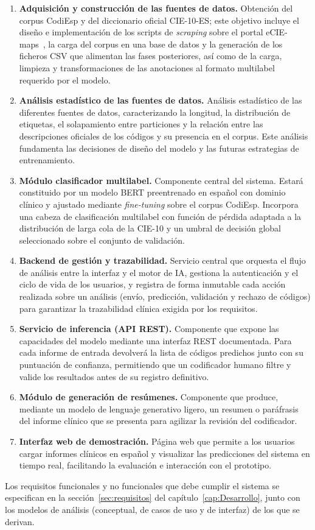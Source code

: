 \begin{enumerate}

 \item \textbf{Adquisición y construcción de las fuentes de datos.} Obtención del corpus CodiEsp y del diccionario oficial CIE-10-ES; este objetivo incluye el diseño e implementación de los scripts de \emph{scraping} sobre el portal eCIE-maps~\cite{eciemaps2024}, la carga del corpus en una base de datos y la generación de los ficheros CSV que alimentan las fases posteriores, así como de la carga, limpieza y transformaciones de las anotaciones al formato multilabel requerido por el modelo.

 \item \textbf{Análisis estadístico de las fuentes de datos.} Análisis estadístico de las diferentes fuentes de datos, caracterizando la longitud, la distribución de etiquetas, el solapamiento entre particiones y la relación entre las descripciones oficiales de los códigos y su presencia en el corpus. Este análisis fundamenta las decisiones de diseño del modelo y las futuras estrategias de entrenamiento.

 \item \textbf{Módulo clasificador multilabel.} Componente central del sistema. Estará constituido por un modelo BERT preentrenado en español con dominio clínico y ajustado mediante \emph{fine-tuning} sobre el corpus CodiEsp. Incorpora una cabeza de clasificación multilabel con función de pérdida adaptada a la distribución de larga cola de la CIE-10 y un umbral de decisión global seleccionado sobre el conjunto de validación.

 \item \textbf{Backend de gestión y trazabilidad.} Servicio central que orquesta el flujo de análisis entre la interfaz y el motor de IA, gestiona la autenticación y el ciclo de vida de los usuarios, y registra de forma inmutable cada acción realizada sobre un análisis (envío, predicción, validación y rechazo de códigos) para garantizar la trazabilidad clínica exigida por los requisitos.

 \item \textbf{Servicio de inferencia (API REST).} Componente que expone las capacidades del modelo mediante una interfaz REST documentada. Para cada informe de entrada devolverá la lista de códigos predichos junto con su puntuación de confianza, permitiendo que un codificador humano filtre y valide los resultados antes de su registro definitivo.

 \item \textbf{Módulo de generación de resúmenes.} Componente que produce, mediante un modelo de lenguaje generativo ligero, un resumen o paráfrasis del informe clínico que se presenta para agilizar la revisión del codificador.

 \item \textbf{Interfaz web de demostración.} Página web que permite a los usuarios cargar informes clínicos en español y visualizar las predicciones del sistema en tiempo real, facilitando la evaluación e interacción con el prototipo.
\end{enumerate}

Los requisitos funcionales y no funcionales que debe cumplir el sistema se especifican en la sección~\ref{sec:requisitos} del capítulo~\ref{cap:Desarrollo}, junto con los modelos de análisis (conceptual, de casos de uso y de interfaz) de los que se derivan.